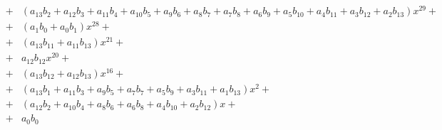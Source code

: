 \documentclass{article}
\begin{document}
\begin{eqnarray*}
&+&   \left(a_{13} b_{2} + a_{12} b_{3} + a_{11} b_{4} + a_{10} b_{5} + a_{9} b_{6} + a_{8} b_{7} + a_{7} b_{8} + a_{6} b_{9} + a_{5} b_{10} + a_{4} b_{11} + a_{3} b_{12} + a_{2} b_{13}\right) x^{29}  + \\
&+&   \left(a_{1} b_{0} + a_{0} b_{1}\right) x^{28}  + \\
&+&   \left(a_{13} b_{11} + a_{11} b_{13}\right) x^{21}  + \\
&+&   a_{12} b_{12} x^{20}  + \\
&+&   \left(a_{13} b_{12} + a_{12} b_{13}\right) x^{16}  + \\
&+&   \left(a_{13} b_{1} + a_{11} b_{3} + a_{9} b_{5} + a_{7} b_{7} + a_{5} b_{9} + a_{3} b_{11} + a_{1} b_{13}\right) x^{2}  + \\
&+&   \left(a_{12} b_{2} + a_{10} b_{4} + a_{8} b_{6} + a_{6} b_{8} + a_{4} b_{10} + a_{2} b_{12}\right) x  + \\
&+&  a_{0} b_{0} \\
\end{eqnarray*}
\end{document}
